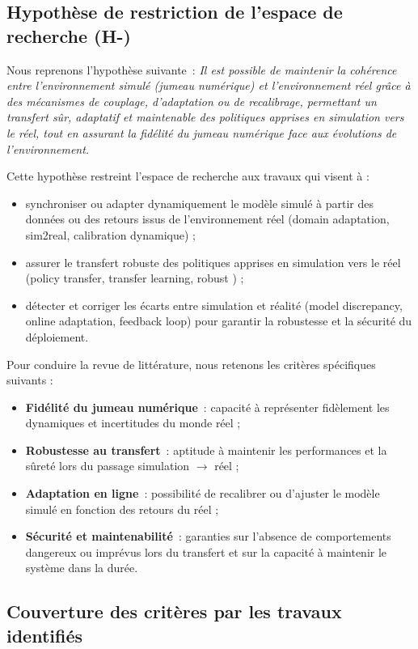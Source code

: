 \subsection*{Hypothèse de restriction de l’espace de recherche (H-)}

Nous reprenons l’hypothèse suivante~: \textit{Il est possible de maintenir la cohérence entre l’environnement simulé (jumeau numérique) et l’environnement réel grâce à des mécanismes de couplage, d’adaptation ou de recalibrage, permettant un transfert sûr, adaptatif et maintenable des politiques apprises en simulation vers le réel, tout en assurant la fidélité du jumeau numérique face aux évolutions de l’environnement.}

Cette hypothèse restreint l’espace de recherche aux travaux qui visent à :
\begin{itemize}
  \item synchroniser ou adapter dynamiquement le modèle simulé à partir des données ou des retours issus de l’environnement réel (domain adaptation, sim2real, calibration dynamique) ;
  \item assurer le transfert robuste des politiques apprises en simulation vers le réel (policy transfer, transfer learning, robust ) ;
  \item détecter et corriger les écarts entre simulation et réalité (model discrepancy, online adaptation, feedback loop) pour garantir la robustesse et la sécurité du déploiement.
\end{itemize}

Pour conduire la revue de littérature, nous retenons les critères spécifiques suivants :
\begin{itemize}
  \item \textbf{Fidélité du jumeau numérique}~: capacité à représenter fidèlement les dynamiques et incertitudes du monde réel ;
  \item \textbf{Robustesse au transfert}~: aptitude à maintenir les performances et la sûreté lors du passage simulation $\rightarrow$ réel ;
  \item \textbf{Adaptation en ligne}~: possibilité de recalibrer ou d’ajuster le modèle simulé en fonction des retours du réel ;
  \item \textbf{Sécurité et maintenabilité}~: garanties sur l’absence de comportements dangereux ou imprévus lors du transfert et sur la capacité à maintenir le système dans la durée.
\end{itemize}

\subsection*{Couverture des critères par les travaux identifiés}

